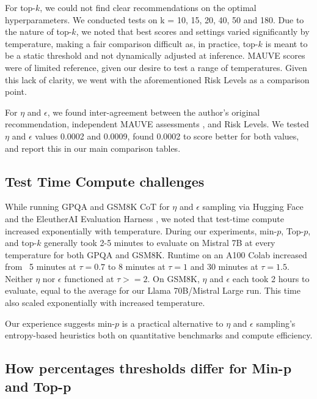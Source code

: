 \documentclass{article}
\begin{document}
For top-$k$, we could not find clear recommendations on the optimal hyperparameters. We conducted tests on k = 10, 15, 20, 40, 50 and 180. Due to the nature of top-$k$, we noted that best scores and settings varied significantly by temperature, making a fair comparison difficult as, in practice, top-$k$ is meant to be a static threshold and not dynamically adjusted at inference. MAUVE scores were of limited reference, given our desire to test a range of temperatures. Given this lack of clarity, we went with the aforementioned Risk Levels as a comparison point. \citep{zhou2024balancingdiversityriskllm}

For \(\eta\) and \(\epsilon\), we found inter-agreement between the author's original recommendation, independent MAUVE assessments \citep{zhu2024improvingopenendedtextgeneration}, and Risk Levels. We tested \(\eta\) and \(\epsilon\) values 0.0002 and 0.0009, found 0.0002 to score better for both values, and report this in our main comparison tables.

\subsection{Test Time Compute challenges}
\label{app:etaisslow}
While running GPQA and GSM8K CoT for \(\eta\) and \(\epsilon\) sampling via Hugging Face and the EleutherAI Evaluation Harness \citep{ eval-harness}, we noted that test-time compute increased exponentially with temperature. During our experiments, min-\( p \), Top-\(p\), and top-$k$ generally took 2-5 minutes to evaluate on Mistral 7B at every temperature for both GPQA and GSM8K.  Runtime on an A100 Colab increased from ~5 minutes at \(\tau = 0.7\) to 8 minutes at \(\tau = 1\) and 30 minutes at \(\tau = 1.5\). Neither \(\eta\) nor \(\epsilon\) functioned at \(\tau >= 2\). On GSM8K, \(\eta\) and \(\epsilon\) each took 2 hours to evaluate, equal to the average for our Llama 70B/Mistral Large run. This time also scaled exponentially with increased temperature.

Our experience suggests min-\( p \) is a practical alternative to \(\eta\) and \(\epsilon\) sampling's entropy-based heuristics both on quantitative benchmarks and compute efficiency.

\subsection{How percentages thresholds differ for Min-p and Top-p}
\label{app:percentagethresholds}
\end{document}
